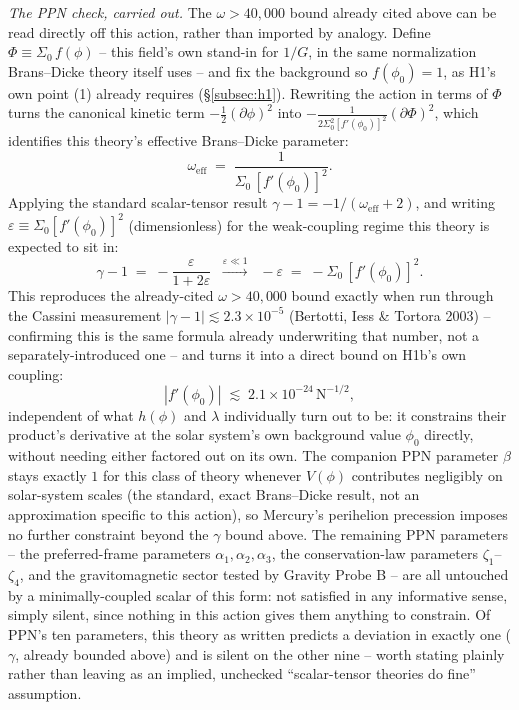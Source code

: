 \documentclass[12pt, a4paper]{article}
\begin{document}
\emph{The PPN check, carried out.} The $\omega>40{,}000$ bound already
cited above can be read directly off this action, rather than imported
by analogy. Define $\Phi\equiv\Sigma_0\,f(\phi)$ -- this field's own
stand-in for $1/G$, in the same normalization Brans--Dicke theory
itself uses -- and fix the background so $f(\phi_0)=1$, as H1's own
point (1) already requires (\S\ref{subsec:h1}). Rewriting the action in
terms of $\Phi$ turns the canonical kinetic term
$-\tfrac12(\partial\phi)^2$ into
$-\tfrac{1}{2\Sigma_0^2[f'(\phi_0)]^2}(\partial\Phi)^2$, which
identifies this theory's effective Brans--Dicke parameter:
\begin{equation}
\omega_{\text{eff}} \;=\; \frac{1}{\Sigma_0\,[f'(\phi_0)]^2}.
\end{equation}
Applying the standard scalar-tensor result $\gamma-1=-1/(\omega_{\text{eff}}+2)$,
and writing $\varepsilon\equiv\Sigma_0[f'(\phi_0)]^2$ (dimensionless) for
the weak-coupling regime this theory is expected to sit in:
\begin{equation}
\gamma - 1 \;=\; -\frac{\varepsilon}{1+2\varepsilon}
\;\;\xrightarrow{\varepsilon\ll1}\;\; -\varepsilon
\;=\; -\Sigma_0\,[f'(\phi_0)]^2.
\end{equation}
This reproduces the already-cited $\omega>40{,}000$ bound exactly when
run through the Cassini measurement $|\gamma-1|\lesssim2.3\times10^{-5}$
(Bertotti, Iess \& Tortora 2003) -- confirming this is the same formula
already underwriting that number, not a separately-introduced one --
and turns it into a direct bound on H1b's own coupling:
\begin{equation}
|f'(\phi_0)| \;\lesssim\; 2.1\times10^{-24}\,\mathrm{N}^{-1/2},
\end{equation}
independent of what $h(\phi)$ and $\lambda$ individually turn out to
be: it constrains their product's derivative at the solar system's own
background value $\phi_0$ directly, without needing either factored
out on its own. The companion PPN parameter $\beta$ stays exactly $1$
for this class of theory whenever $V(\phi)$ contributes negligibly on
solar-system scales (the standard, exact Brans--Dicke result, not an
approximation specific to this action), so Mercury's perihelion
precession imposes no further constraint beyond the $\gamma$ bound
above. The remaining PPN parameters -- the preferred-frame parameters
$\alpha_1,\alpha_2,\alpha_3$, the conservation-law parameters
$\zeta_1$--$\zeta_4$, and the gravitomagnetic sector tested by Gravity
Probe B -- are all untouched by a minimally-coupled scalar of this
form: not satisfied in any informative sense, simply silent, since
nothing in this action gives them anything to constrain. Of PPN's ten
parameters, this theory as written predicts a deviation in exactly one
($\gamma$, already bounded above) and is silent on the other nine --
worth stating plainly rather than leaving as an implied, unchecked
``scalar-tensor theories do fine'' assumption.
\end{document}
